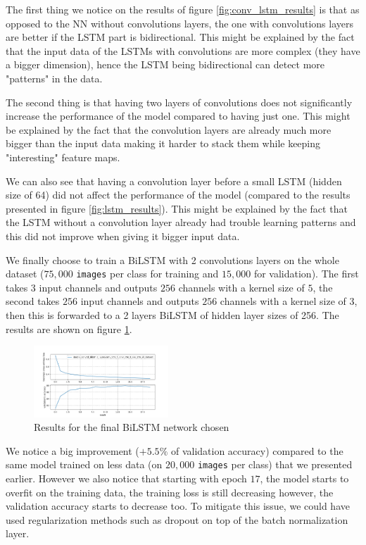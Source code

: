 \documentclass[10pt,twocolumn,letterpaper]{article}
\begin{document}
The first thing we notice on the results of figure \ref{fig:conv_lstm_results} is that as opposed to the NN without convolutions layers, the one with convolutions layers are better if the LSTM part is bidirectional. This might be explained by the fact that the input data of the LSTMs with convolutions are more complex (they have a bigger dimension), hence the LSTM being bidirectional can detect more "patterns" in the data.

The second thing is that having two layers of convolutions does not significantly increase the performance of the model compared to having just one. This might be explained by the fact that the convolution layers are already much more bigger than the input data making it harder to stack them while keeping "interesting" feature maps.

We can also see that having a convolution layer before a small LSTM (hidden size of 64) did not affect the performance of the model (compared to the results presented in figure \ref{fig:lstm_results}). This might be explained by the fact that the LSTM without a convolution layer already had trouble learning patterns and this did not improve when giving it bigger input data.

We finally choose to train a BiLSTM with 2 convolutions layers on the whole dataset ($75,000$ \texttt{images} per class for training and $15,000$ for validation). The first takes $3$ input channels and outputs $256$ channels with a kernel size of $5$, the second takes $256$ input channels and outputs $256$ channels with a kernel size of $3$, then this is forwarded to a 2 layers BiLSTM of hidden layer sizes of 256. The results are shown on figure \ref{fig:final_lstm_results}.

\begin{figure}[h] 
\centering
\includegraphics[width=0.45\textwidth]{images/lstm_final_result.png}
\caption{Results for the final BiLSTM network chosen}
\label{fig:final_lstm_results}
\end{figure}

We notice a big improvement ($+5.5\%$ of validation accuracy) compared to the same model trained on less data (on $20,000$ \texttt{images} per class) that we presented earlier. However we also notice that starting with epoch $17$, the model starts to overfit on the training data, the training loss is still decreasing however, the validation accuracy starts to decrease too. To mitigate this issue, we could have used regularization methods such as dropout on top of the batch normalization \cite{ioffe2015batch} layer.
\end{document}
